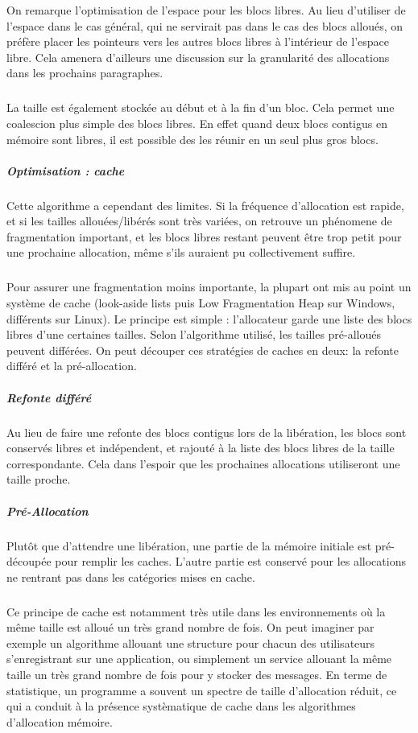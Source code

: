 On remarque l'optimisation de l'espace pour les blocs libres. Au lieu d'utiliser de l'espace dans le cas général, qui ne servirait pas dans le cas des blocs alloués,
on préfère placer les pointeurs vers les autres blocs libres à l'intérieur de l'espace libre. Cela amenera d'ailleurs une discussion sur la granularité des allocations dans
les prochains paragraphes.
\subparagraph{}
La taille est également stockée au début et à la fin d'un bloc. Cela permet une coalescion plus simple des blocs libres. En effet quand deux blocs contigus en
mémoire sont libres, il est possible des les réunir en un seul plus gros blocs.

\subparagraph{Optimisation : cache}
Cette algorithme a cependant des limites. Si la fréquence d'allocation est rapide, et si les tailles allouées/libérés sont très variées, on retrouve un phénomene de
fragmentation important, et les blocs libres restant peuvent être trop petit pour une prochaine allocation, même s'ils auraient pu collectivement suffire.
\subparagraph{}
Pour assurer une fragmentation moins importante, la plupart ont mis au point un système de cache (look-aside lists puis Low Fragmentation Heap sur Windows, différents sur Linux).
Le principe est simple : l'allocateur garde une liste des blocs libres d'une certaines tailles. Selon l'algorithme utilisé, les tailles pré-alloués peuvent différées.
On peut découper ces stratégies de caches en deux: la refonte différé et la pré-allocation.

\subparagraph{Refonte différé}
Au lieu de faire une refonte des blocs contigus lors de la libération, les blocs sont conservés libres et indépendent, et rajouté à la liste des blocs libres de
la taille correspondante. Cela dans l'espoir que les prochaines allocations utiliseront une taille proche.

\subparagraph{Pré-Allocation}
Plutôt que d'attendre une libération, une partie de la mémoire initiale est pré-découpée pour remplir les caches. L'autre partie est conservé pour les allocations
ne rentrant pas dans les catégories mises en cache.

\subparagraph{}
Ce principe de cache est notamment très utile dans les environnements où la même taille est alloué un très grand nombre de fois. On peut imaginer par exemple un
algorithme allouant une structure pour chacun des utilisateurs s'enregistrant sur une application, ou simplement un service allouant la même taille un très grand nombre
de fois pour y stocker des messages. En terme de statistique, un programme a souvent un spectre de taille d'allocation réduit, ce qui a conduit à la présence systèmatique de
cache dans les algorithmes d'allocation mémoire.


